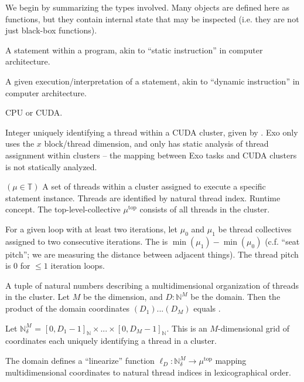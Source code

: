 




We begin by summarizing the types involved.
Many objects are defined here as functions, but they contain internal state that may be inspected (i.e. they are not just black-box functions).

\filbreak
{} A statement within a program, akin to ``static instruction'' in computer architecture.

\filbreak
{} A given execution/interpretation of a statement, akin to ``dynamic instruction'' in computer architecture.

\filbreak
{} CPU or CUDA.

\filbreak
{} Integer uniquely identifying a thread within a CUDA cluster, given by .
Exo only uses the $x$ block/thread dimension, and only has static analysis of thread assignment within clusters -- the mapping between Exo tasks and CUDA clusters is not statically analyzed.

\filbreak
{} $(\mu \in \mathbb{T})$ A set of threads within a cluster assigned to execute a specific statement instance.
Threads are identified by natural thread index.
Runtime concept.
The top-level-collective $\mu^\text{top}$ consists of all threads in the cluster.

For a given  loop with at least two iterations, let $\mu_0$ and $\mu_1$ be thread collectives assigned to two consecutive iterations.
The  is $\min(\mu_1) - \min(\mu_0)$
(c.f. ``seat pitch''; we are measuring the distance between adjacent things).
The thread pitch is 0 for $\le 1$ iteration loops.

\filbreak
{} A tuple of natural numbers describing a multidimensional organization of threads in the cluster.
Let $M$ be the dimension, and $D: \mathbb{N}^M$ be the domain.
Then the product of the domain coordinates $(D_1) ...(D_M)$ equals .

Let $\mathbb{N}^M_\delta$ = $[0, D_1 - 1]_\mathbb{N} \times ... \times [0, D_M - 1]_\mathbb{N}$.
This is an $M$-dimensional grid of coordinates each uniquely identifying a thread in a cluster.

The domain defines a ``linearize'' function $\ell_D: \mathbb{N}^M_\delta \to \mu^\text{top}$ mapping multidimensional coordinates to natural thread indices in lexicographical order.

